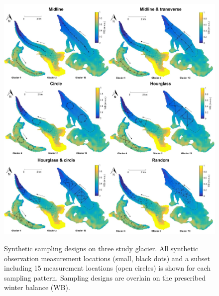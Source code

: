 \documentclass[twocolumn,letterpaper]{igs}
\begin{document}

\begin{figure}
	\centering
	\includegraphics[width =\textwidth]{SamplingDesignAll.pdf}\\
	\caption{Synthetic sampling designs on three study glacier. All synthetic observation measurement locations (small, black dots) and a subset including 15 measurement locations (open circles) is shown for each sampling pattern. Sampling designs are overlain on the prescribed winter balance (WB). } 
       \label{fig:SyntheticSampleDesign}
\end{figure}
\end{document}
